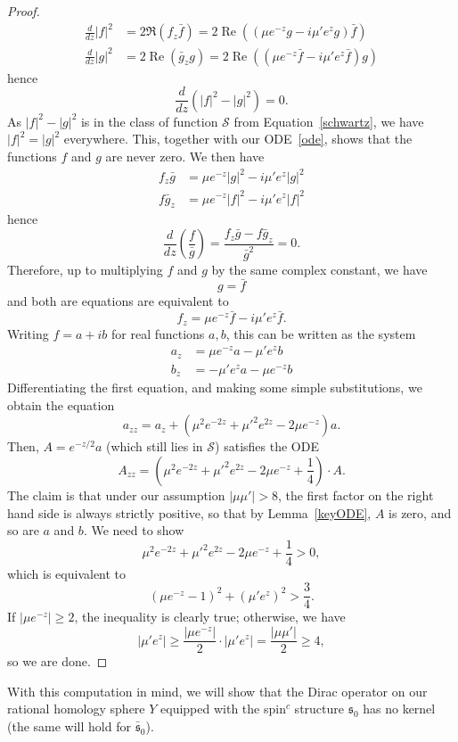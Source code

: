 \documentclass[11pt]{article}
\theoremstyle{definition}
\numberwithin{equation}{section}
\numberwithin{figure}{section}
\numberwithin{table}{section}
\newcommand{\spin}{\mathfrak{s}}
\DeclareMathOperator{\Rel}{Re}
\begin{document}
\begin{proof}
\begin{align*}
\frac{d}{dz}|f|^2&=2\Re\left(f_z\bar{f}\right)=2\Rel\left((\mu e^{-z}g-i\mu'e^zg)\bar{f}\right)\\
\frac{d}{dz}|g|^2&=2\Rel\left(\bar{g}_z{g}\right)=2\Rel\left(\left(\mu e^{-z}\bar{f}-i\mu'e^z\bar{f}\right)g\right)
\end{align*}
hence
\[
\frac{d}{dz}(|f|^2-|g|^2)=0.
\]
As $|f|^2-|g|^2$ is in the class of function $\mathcal{S}$ from Equation~\eqref{schwartz}, we have $|f|^2=|g|^2$ everywhere. This, together with our ODE~\eqref{ode}, shows that the functions $f$ and $g$ are never zero. We then have
\begin{align*}
f_z\bar{g}&=\mu e^{-z}|g|^2-i\mu'e^{z}|g|^2\\
f\bar{g}_z&=\mu e^{-z}|f|^2-i\mu'e^{z}|f|^2
\end{align*}
hence
\[
\frac{d}{dz}\left(\frac{f}{\bar{g}}\right)=\frac{f_z\bar{g}-f\bar{g}_z}{\bar{g}^2}=0.
\]
Therefore, up to multiplying $f$ and $g$ by the same complex constant, we have
\[
g=\bar{f}
\]
and both are equations are equivalent to
\[
f_z=\mu e^{-z}\bar{f}-i\mu'e^{z}\bar{f}.
\]
Writing $f=a+ib$ for real functions $a,b$, this can be written as the system
\begin{align*}
a_z&=\mu e^{-z}a-\mu'e^zb\\
b_z&=-\mu'e^za-\mu e^{-z}b
\end{align*}
Differentiating the first equation, and making some simple substitutions, we obtain the equation
\[
a_{zz}=a_z+\left(\mu^2e^{-2z}+\mu'^2e^{2z}-2\mu e^{-z}\right)a.
\]
Then, $A=e^{-z/2}a$ (which still lies in $\mathcal{S}$) satisfies the ODE
\[
A_{zz}=\left(\mu^2e^{-2z}+\mu'^2e^{2z}-2\mu e^{-z}+\frac{1}{4}\right)\cdot A.
\]
The claim is that under our assumption $|\mu\mu'|>8$, the first factor on the right hand side is always strictly positive, so that by Lemma~\ref{keyODE}, $A$ is zero, and so are $a$ and $b$. We need to show
\[
\mu^2e^{-2z}+\mu'^2e^{2z}-2\mu e^{-z}+\frac{1}{4}>0,
\]
which is equivalent to
\[
(\mu e^{-z}-1)^2+(\mu'e^z)^2>\frac{3}{4}.
\]
If $|\mu e^{-z}|\geq 2$, the inequality is clearly true; otherwise, we have
\[
|\mu'e^z|\geq \frac{|\mu e^{-z}|}{2}\cdot |\mu' e^z|=\frac{|\mu\mu'|}{2}\geq 4,
\]
so we are done.
\end{proof}


With this computation in mind, we will show that the Dirac operator on our rational homology sphere $Y$ equipped with the spin$^c$ structure $\spin_0$ has no kernel (the same will hold for $\bar{\spin}_0$).
\end{document}
